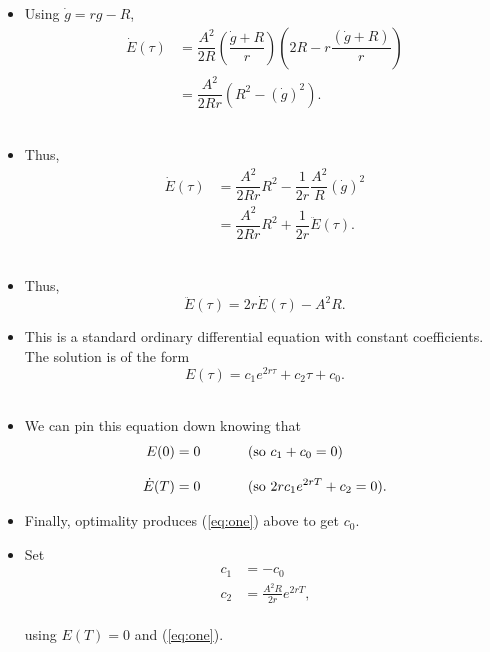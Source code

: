 \documentclass[12pt,compress,handout]{beamer}  %
\begin{document}
\begin{frame}
\begin{itemize}
\item Using $\dot{g}=rg-R$,
\begin{align*}
\dot{E}(\tau )& =\dfrac{A^{2}}{2R}\left( \dfrac{\dot{g}+R}{r}\right) \left( 2R-r\dfrac{(\dot{g}+R)}{r}\right) \\[3mm]
& =\dfrac{A^{2}}{2Rr}(R^{2}-(\dot{g})^{2})\text{.}
\end{align*}\ \\[3mm]
\item Thus,
\begin{align*}
\dot{E}(\tau )& =\dfrac{A^{2}}{2Rr}R^{2}-\dfrac{1}{2r}\dfrac{A^{2}}{R}(\dot{g})^{2}\\[3mm]
& =\dfrac{A^{2}}{2Rr}R^{2}+\dfrac{1}{2r}\ddot{E}(\tau)\text{.}
\end{align*}\ \\[3mm]
\item Thus,
\begin{equation}
\ddot{E}(\tau )=2r\dot{E}(\tau )-A^{2}R\text{.}\label{eq:one}
\end{equation}
\end{itemize}
\end{frame}

\begin{frame}
\begin{itemize}
\item This is a standard ordinary differential equation with constant coefficients. The solution is of the form
\begin{equation*}
E(\tau )=c_{1}e^{2r\tau }+c_{2}\tau +c_{0}\text{.}
\end{equation*}\ \\[3mm]
\item We can pin this equation down knowing that
\begin{align*}
E(0)=0\hspace{12mm}&\text{(so $c_{1}+c_{0}=0$)}\\[3mm]
\dot{E}(T)=0\hspace{12mm}&\text{(so $2rc_{1}e^{2rT}+c_{2}=0$).}
\end{align*}
\end{itemize}
\end{frame}

\begin{frame}
\begin{itemize}
\item Finally, optimality produces (\ref{eq:one}) above to get $c_0$.\\[5mm]
\item Set
\begin{align*}
c_{1}& =-c_{0}\\[3mm]
c_2& =\frac{A^2R}{2r}e^{2rT}\text{,}
\end{align*}\ \\[2mm]
using $E(T)=0$ and (\ref{eq:one}).
\end{itemize}
\end{frame}
\end{document}
